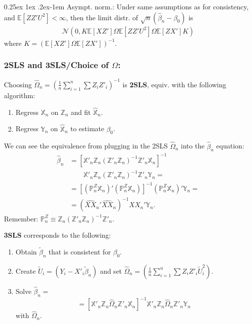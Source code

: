 \documentclass[9pt]{extarticle}
\makeatletter
\newcommand{\PP}{\mathbb{P}}
\newcommand{\EE}{\mathbb{E}}
\newcommand{\ZZ}{\mathbb{Z}}
\newcommand{\XX}{\mathbb{X}}
\newcommand{\YY}{\mathbb{Y}}
\renewcommand{\paragraph}{%
  \@startsection{paragraph}{4}%
  {\z@}{0.25ex \@plus 1ex \@minus .2ex}{-1em}%
  {\normalfont\normalsize\bfseries}%
}
\newenvironment{noshow}{}{}
\makeatother
\begin{document}
\begin{multicols*}{4}
\begin{noshow}
\paragraph{Asympt. norm.:} Under same assumptions as for consistency, and $\EE[Z Z' U^2] < \infty$, then the limit distr. of $\sqrt{n}(\hat{\beta}_n - \beta_0)$ is
\begin{align*}
    \mathcal{N}(0, K\EE[XZ']\Omega \EE[ZZ'U^2]\Omega \EE[ZX']K)
\end{align*}
where $K = (\EE[XZ']\Omega\EE[ZX'])^{-1}$.
\end{noshow}


\subsubsection*{2SLS and 3SLS/Choice of $\Omega$:}
Choosing $\hat{\Omega}_{n}=\left(\frac{1}{n}\sum_{i=1}^{n}{\sum}Z_{i}Z'_{i}\right)^{-1}$ is \textbf{2SLS}, equiv. with the following algorithm:

\begin{enumerate}
    \item Regress $\XX_n$ on $\ZZ_n$ and fit $\hat{\XX}_{n}$.
    \item Regress $\YY_n$ on $\hat{\XX}_{n}$ to estimate $\beta_{0}$.
\end{enumerate}

We can see the equivalence from plugging in the 2SLS $\hat{\Omega}_{n}$ into the $\hat{\beta}_{n}$ equation:
\begin{align*}
\hat{\beta}_{n}	&=[ \XX'_{n}\ZZ_{n}(\ZZ'_{n}\ZZ_{n})^{-1}\ZZ'_{n}\XX_{n}]^{-1} \\
& \qquad \XX'_{n}\ZZ_{n}(\ZZ'_{n}\ZZ_{n})^{-1}\ZZ'_{n}\YY_{n} = \\
%
%
&= [(\PP_{n}^{Z}\XX_n)'(\PP_{n}^{Z}\XX_{n})]^{-1} (\PP_{n}^{Z}\XX_{n})'\YY_{n} = \\
&=(\hat{XX}_n'\hat{XX}_n)^{-1}\hat{XX}_n'\YY_n.
\end{align*}
Remember: $\PP_{n}^{Z}\equiv\ZZ_{n}\left(\ZZ'_{n}\ZZ_{n}\right)^{-1}\ZZ'_{n}$.

\textbf{3SLS} corresponds to the following: 
\begin{enumerate}
    \item Obtain $\tilde{\beta}_{n}$ that is consistent for $\beta_{0}$.
    \item Create $\tilde{U}_{i}=(Y_{i}-X'_{i}\tilde{\beta}_{n})$ and set $\hat{\Omega}_{n}=(\frac{1}{n}\sum_{i=1}^{n}{\sum}Z_{i}Z'_{i}\tilde{U}_{i}^{2})$.
    \item Solve $\hat{\beta}_{n} = $ $$=[ \XX'_{n}\ZZ_{n}\hat{\Omega}_{n}\ZZ'_{n}\XX_{n}] ^{-1}{\XX'_{n}\ZZ_{n}\hat{\Omega}_{n}\ZZ'_{n}\YY_{n}}$$ with $\hat{\Omega}_{n}$.
\end{enumerate}


\end{multicols*}
\end{document}
